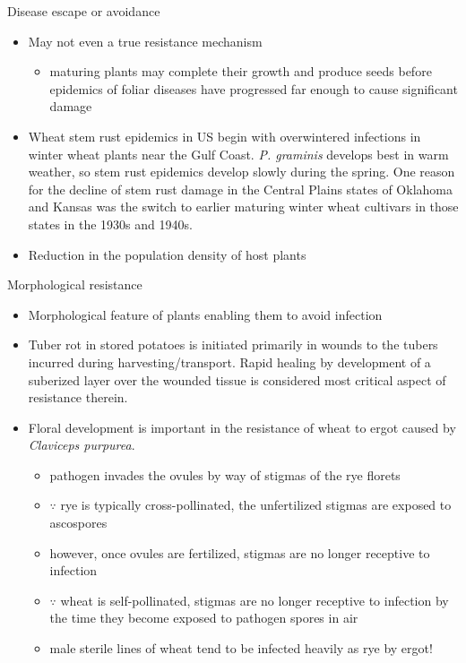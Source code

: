 \documentclass[11pt,dvipsnames,ignorenonframetext,aspectratio=169]{beamer}
\providecommand{\tightlist}{%
  \setlength{\itemsep}{0pt}\setlength{\parskip}{0pt}}
\begin{document}
\begin{frame}{Disease escape or avoidance}
\protect\hypertarget{disease-escape-or-avoidance}{}
\begin{itemize}
\tightlist
\item
  May not even a true resistance mechanism

  \begin{itemize}
  \tightlist
  \item
    maturing plants may complete their growth and produce seeds before
    epidemics of foliar diseases have progressed far enough to cause
    significant damage
  \end{itemize}
\item
  Wheat stem rust epidemics in US begin with overwintered infections in
  winter wheat plants near the Gulf Coast. \textit{P. graminis} develops
  best in warm weather, so stem rust epidemics develop slowly during the
  spring. One reason for the decline of stem rust damage in the Central
  Plains states of Oklahoma and Kansas was the switch to earlier
  maturing winter wheat cultivars in those states in the 1930s and
  1940s.
\item
  Reduction in the population density of host plants
\end{itemize}
\end{frame}

\begin{frame}{Morphological resistance}
\protect\hypertarget{morphological-resistance}{}
\begin{itemize}
\tightlist
\item
  Morphological feature of plants enabling them to avoid infection
\item
  Tuber rot in stored potatoes is initiated primarily in wounds to the
  tubers incurred during harvesting/transport. Rapid healing by
  development of a suberized layer over the wounded tissue is considered
  most critical aspect of resistance therein.
\item
  Floral development is important in the resistance of wheat to ergot
  caused by \textit{Claviceps purpurea}.

  \begin{itemize}
  \tightlist
  \item
    pathogen invades the ovules by way of stigmas of the rye florets
  \item
    \(\because\) rye is typically cross-pollinated, the unfertilized
    stigmas are exposed to ascospores
  \item
    however, once ovules are fertilized, stigmas are no longer receptive
    to infection
  \item
    \(\because\) wheat is self-pollinated, stigmas are no longer
    receptive to infection by the time they become exposed to pathogen
    spores in air
  \item
    male sterile lines of wheat tend to be infected heavily as rye by
    ergot!
  \end{itemize}
\end{itemize}
\end{frame}
\end{document}
